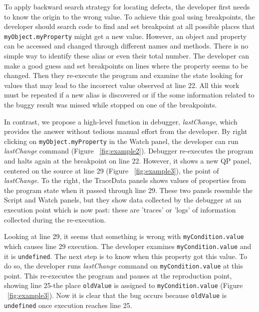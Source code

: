 \documentclass[preprint]{sigplanconf}
\begin{document}
To apply backward search strategy for locating defects, the developer
first needs to know the origin to the wrong value. To achieve this
goal using breakpoints, the developer should search code to find and
set breakpoint at all possible places that
\texttt{myObject.myProperty} might get a new value.  However, an
object and property can be accessed and changed through different
names and methods. There is no simple way to identify these alias or
even their total number.  The developer can make a good guess and set
breakpoints on lines where the property seems to be changed. Then they
re-execute the program and examine the state looking for values that
may lead to the incorrect value observed at line 22. All this work
must be repeated if a new alias is discovered or if the some
information related to the buggy result was missed while stopped on
one of the breakpoints.

In contrast, we propose a high-level function in debugger,
\textit{lastChange}, which provides the answer without tedious manual
effort from the developer. By right clicking on
\texttt{myObject.myProperty} in the Watch panel, the developer can run
\textit{lastChange} command (Figure ~\ref{fig:example2}). Debugger
re-executes the program and halts again at the breakpoint on line 22.
However, it shows a new QP panel, centered on the source at line 29
(Figure ~\ref{fig:example3}), the point of \textit{lastChange}.  To
the right, the TraceData panels shows values of properties from the
program state when it passed through line 29.  These two panels
resemble the Script and Watch panels, but they show data collected by
the debugger at an execution point which is now past: these are
'traces' or 'logs' of information collected during the re-execution.

Looking at line 29, it seems that something is wrong with
\texttt{myCondition.value} which causes line 29 execution. The
developer examines \texttt{myCondition.value} and it is
\texttt{undefined}. The next step is to know when this property got
this value. To do so, the developer runs \textit{lastChange} command
on \texttt{myCondition.value} at this point. This re-executes the
program and pauses at the reproduction point,  showing line 25-the
place \texttt{oldValue} is assigned to
\texttt{myCondition.value} (Figure ~\ref{fig:example3}). Now it is
clear that the bug occurs because \texttt{oldValue} is
\texttt{undefined} once execution reaches line 25.
\end{document}
